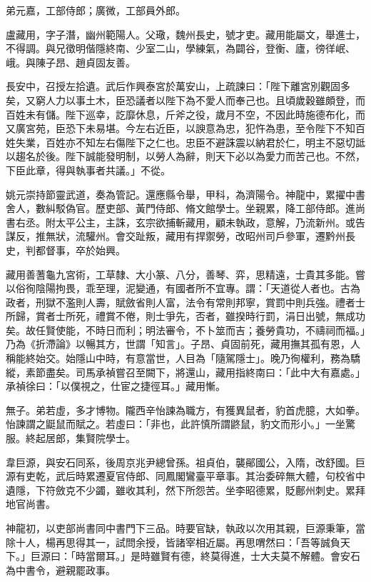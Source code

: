 \begin{pinyinscope}
 弟元嘉，工部侍郎；廣微，工部員外郎。



 盧藏用，字子潛，幽州範陽人。父璥，魏州長史，號才吏。藏用能屬文，舉進士，不得調。與兄徵明偕隱終南、少室二山，學練氣，為闢谷，登衡、廬，徬徉岷、峨。與陳子昂、趙貞固友善。



 長安中，召授左拾遺。武后作興泰宮於萬安山，上疏諫曰：「陛下離宮別觀固多矣，又窮人力以事土木，臣恐議者以陛下為不愛人而奉己也。且頃歲穀雖頗登，而百姓未有儲。陛下巡幸，訖靡休息，斤斧之役，歲月不空，不因此時施德布化，而又廣宮苑，臣恐下未易堪。今左右近臣，以諛意為忠，犯忤為患，至令陛下不知百姓失業，百姓亦不知左右傷陛下之仁也。忠臣不避誅震以納君於仁，明主不惡切詆以趨名於後。陛下誠能發明制，以勞人為辭，則天下必以為愛力而苦己也。不然，下臣此章，得與執事者共議。」不從。



 姚元崇持節靈武道，奏為管記。還應縣令舉，甲科，為濟陽令。神龍中，累擢中書舍人，數糾駁偽官。歷吏部、黃門侍郎、脩文館學士。坐親累，降工部侍郎。進尚書右丞。附太平公主，主誅，玄宗欲捕斬藏用，顧未執政，意解，乃流新州。或告謀反，推無狀，流驩州。會交趾叛，藏用有捍禦勞，改昭州司戶參軍，遷黔州長史，判都督事，卒於始興。



 藏用善蓍龜九宮術，工草隸、大小篆、八分，善琴、弈，思精遠，士貴其多能。嘗以俗徇陰陽拘畏，乖至理，泥變通，有國者所不宜專。謂：「天道從人者也。古為政者，刑獄不濫則人壽，賦斂省則人富，法令有常則邦寧，賞罰中則兵強。禮者士所歸，賞者士所死，禮賞不倦，則士爭先，否者，雖揆時行罰，涓日出號，無成功矣。故任賢使能，不時日而利；明法審令，不卜筮而吉；養勞貴功，不禱祠而福。」乃為《折滯論》以暢其方，世謂「知言」。子昂、貞固前死，藏用撫其孤有恩，人稱能終始交。始隱山中時，有意當世，人目為「隨駕隱士」。晚乃徇權利，務為驕縱，素節盡矣。司馬承禎嘗召至闕下，將還山，藏用指終南曰：「此中大有嘉處。」承禎徐曰：「以僕視之，仕宦之捷徑耳。」藏用慚。



 無子。弟若虛，多才博物。隴西辛怡諫為職方，有獲異鼠者，豹首虎臆，大如拳。怡諫謂之鼮鼠而賦之。若虛曰：「非也，此許慎所謂鼨鼠，豹文而形小。」一坐驚服。終起居郎，集賢院學士。



 韋巨源，與安石同系，後周京兆尹總曾孫。祖貞伯，襲鄖國公，入隋，改舒國。巨源有吏乾，武后時累遷夏官侍郎、同鳳閣鸞臺平章事。其治委碎無大體，句校省中遺隱，下符斂克不少蠲，雖收其利，然下所怨苦。坐李昭德累，貶鄜州刺史。累拜地官尚書。



 神龍初，以吏部尚書同中書門下三品。時要官缺，執政以次用其親，巨源秉筆，當除十人，楊再思得其一，試問余授，皆諸宰相近屬。再思喟然曰：「吾等誠負天下。」巨源曰：「時當爾耳。」是時雖賢有德，終莫得進，士大夫莫不解體。會安石為中書令，避親罷政事。




\end{pinyinscope}
